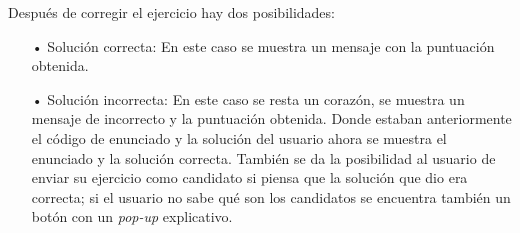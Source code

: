 Después de corregir el ejercicio hay dos posibilidades:
\begin{itemize}
\item[•]Solución correcta: En este caso se muestra un mensaje con la puntuación obtenida.

\begin{figure}[H]
\begin{center}
\end{center}
\end{figure}

\item[•]Solución incorrecta: En este caso se resta un corazón, se muestra un mensaje de incorrecto y la puntuación obtenida. Donde estaban anteriormente el código de enunciado y la solución del usuario ahora se muestra el enunciado y la solución correcta. También se da la posibilidad al usuario de enviar su ejercicio como candidato si piensa que la solución que dio era correcta; si el usuario no sabe qué son los candidatos se encuentra también un botón con un \textit{pop-up} explicativo.

\begin{figure}[H]
\begin{center}
\end{center}
\end{figure}


\end{itemize}
